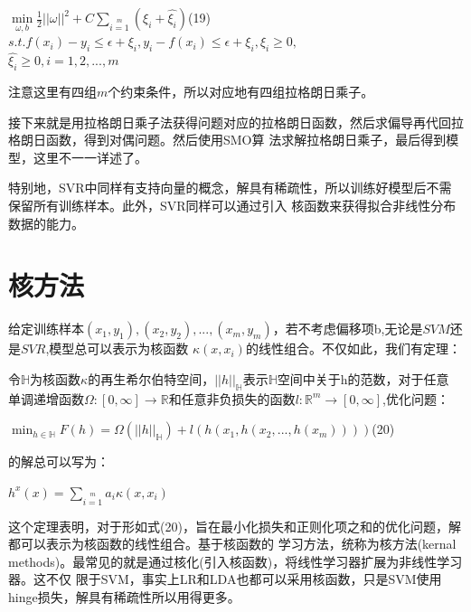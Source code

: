 \documentclass[UTF8]{ctexart}
\begin{document}
{\begin{center}
    \Large{
        $\min\limits_{\omega,b}\frac{1}{2}||\omega||^2+C\sum\limits_{i=1}\limits^m(\xi_i+\hat{\xi_i})$\quad(19)\\[2ex]
        $s.t. f(x_i)-y_i\leq \epsilon+\xi_i,y_i-f(x_i)\leq \epsilon+\xi_i,\xi_i\geq 0,$\\[2ex]
        $\hat{\xi_i}\geq 0,i=1,2,...,m$
    }
\end{center}
注意这里有四组$m$个约束条件，所以对应地有四组拉格朗日乘子。\par
接下来就是用拉格朗日乘子法获得问题对应的拉格朗日函数，然后求偏导再代回拉格朗日函数，得到对偶问题。然后使用SMO算
法求解拉格朗日乘子，最后得到模型，这里不一一详述了。\par
特别地，SVR中同样有支持向量的概念，解具有稀疏性，所以训练好模型后不需保留所有训练样本。此外，SVR同样可以通过引入
核函数来获得拟合非线性分布数据的能力。\newpage
\section{核方法}
给定训练样本${(x_1,y_1),(x_2,y_2),...,(x_m,y_m)}$，若不考虑偏移项b,无论是$SVM$还是$SVR$,模型总可以表示为核函数
$\kappa(x,x_i)$的线性组合。不仅如此，我们有定理：\par
令$\mathbb{H}$为核函数$\kappa$的再生希尔伯特空间，$||h||_\mathbb{H}$表示$\mathbb{H}$空间中关于h的范数，对于任意
单调递增函数$\Omega:[0,\infty]\to \mathbb{R}$和任意非负损失的函数$l:\mathbb{R}^m\to [0,\infty]$,优化问题：
\begin{center}
    $\min_{h\in\mathbb{H}}F(h)=\Omega(||h||_{\mathbb{H}})+l(h(x_1,h(x_2,...,h(x_m))))$\quad(20)
\end{center}
的解总可以写为：\par
\begin{center}
    $h^x(x)=\sum\limits_{i=1}\limits^ma_i\kappa(x,x_i)$
\end{center}
这个定理表明，对于形如式(20)，旨在最小化损失和正则化项之和的优化问题，解都可以表示为核函数的线性组合。基于核函数的
学习方法，统称为核方法(kernal methods)。最常见的就是通过核化(引入核函数)，将线性学习器扩展为非线性学习器。这不仅
限于SVM，事实上LR和LDA也都可以采用核函数，只是SVM使用hinge损失，解具有稀疏性所以用得更多。
}
\end{document}
